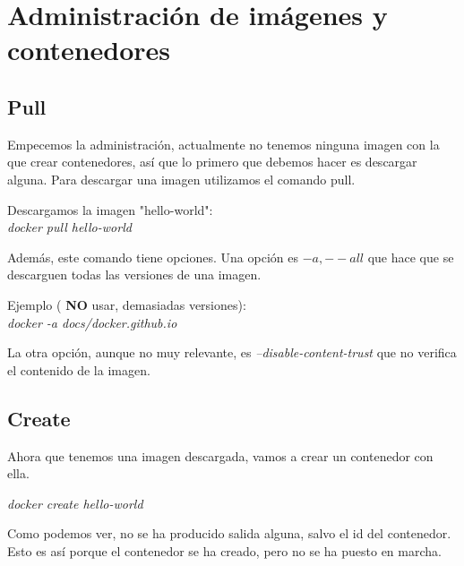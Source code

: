 \documentclass[]{article}
\begin{document}
\section{Administración de imágenes y contenedores}

\subsection{Pull}

Empecemos la administración, actualmente no tenemos ninguna imagen con la que crear contenedores, así que lo primero que debemos hacer es descargar alguna.
Para descargar una imagen utilizamos el comando pull.

\begin{center}
	
	Descargamos la imagen "hello-world":
	\vspace{1mm}
	\\
	\em docker pull hello-world
	
\end{center}

Además, este comando tiene opciones.
Una opción es $ -a,--all $ que hace que se descarguen todas las versiones de una imagen.

\begin{center}
Ejemplo  ( {\bf NO} usar, demasiadas versiones): 
\\
\vspace{1mm}
\em docker -a docs/docker.github.io

\end{center}

La otra opción, aunque no muy relevante, es  {\it --disable-content-trust }  que no verifica el contenido de la imagen.


\subsection{Create}

Ahora que tenemos una imagen descargada, vamos a crear un contenedor con ella.

\begin{center}

	\it
	docker create hello-world

\end{center}

Como podemos ver, no se ha producido salida alguna, salvo el id del contenedor.
Esto es así porque el contenedor se ha creado, pero no se ha puesto en marcha.
\end{document}

